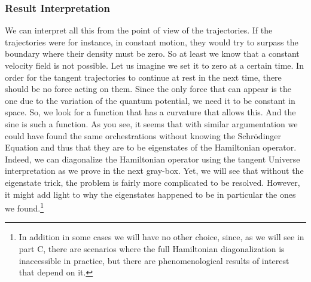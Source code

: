 \documentclass[11pt, a4paper]{article} %
\begin{document}
\subsubsection*{Result Interpretation}
We can interpret all this from the point of view of the trajectories. If the trajectories were for instance, in constant motion, they would try to surpass the boundary where their density must be zero. So at least we know that a constant velocity field is not possible. Let us imagine we set it to zero at a certain time. In order for the tangent trajectories to continue at rest in the next time, there should be no force acting on them. Since the only force that can appear is the one due to the variation of the quantum potential, we need it to be constant in space. So, we look for a function that has a curvature that allows this. And the sine is such a function. As you see, it seems that with similar argumentation we could have found the same orchestrations without knowing the Schrödinger Equation and thus that they are to be eigenstates of the Hamiltonian operator. Indeed, we can diagonalize the Hamiltonian operator using the tangent Universe interpretation as we prove in the next gray-box. Yet, we will see that without the eigenstate trick, the problem is fairly more complicated to be resolved. However, it might add light to why the eigenstates happened to be in particular the ones we found.\footnote{In addition in some cases we will have no other choice, since, as we will see in part C, there are scenarios where the full Hamiltonian diagonalization is inaccessible in practice, but there are phenomenological results of interest that depend on it.}
\end{document}
